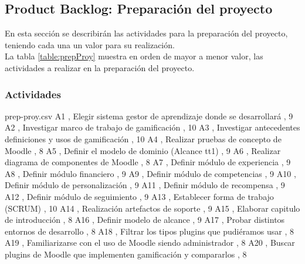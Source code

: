 \subsection{Product Backlog: Preparación del proyecto}

En esta sección se describirán las actividades para la preparación del proyecto, teniendo cada una un valor para su realización.\\

La tabla \ref{table:prepProy} muestra en orden de mayor a menor valor, las actividades a realizar en la preparación del proyecto.\\

\subsubsection{Actividades}

\begin{filecontents*}{prep-proy.csv}
 A1 , Elegir sistema gestor de aprendizaje donde se desarrollará , 9
 A2 , Investigar marco de trabajo de gamificación , 10
 A3 , Investigar antecedentes definiciones y usos de gamificación , 10
 A4 , Realizar pruebas de concepto de Moodle , 8
 A5 , Definir el modelo de dominio (Alcance tt1) , 9
 A6 , Realizar diagrama de componentes de Moodle , 8
 A7 , Definir módulo de experiencia , 9
 A8 , Definir módulo financiero , 9
 A9 , Definir módulo de competencias , 9
 A10 , Definir módulo de personalización , 9
 A11 , Definir módulo de recompensa , 9
 A12 , Definir módulo de seguimiento , 9
 A13 , Establecer forma de trabajo (SCRUM) , 10
 A14 , Realización artefactos de soporte , 9
 A15 , Elaborar capitulo de introducción , 8
 A16 , Definir modelo de alcance , 9
 A17 , Probar distintos entornos de desarrollo , 8
 A18 , Filtrar los tipos plugins que pudiéramos usar , 8
 A19 , Familiarizarse con el uso de Moodle siendo administrador , 8
 A20 , Buscar plugins de Moodle que implementen gamificación y compararlos , 8
\end{filecontents*}

